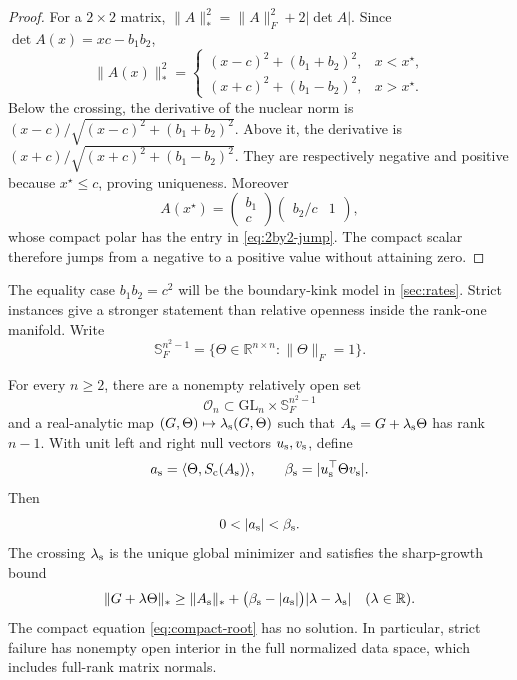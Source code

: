 \begin{proof}
For a \(2\times2\) matrix,
\(\|A\|_*^2=\|A\|_F^2+2|\det A|\).  Since
\(\det A(x)=xc-b_1b_2\),
\begin{equation}
 \|A(x)\|_*^2=
 \begin{cases}
 (x-c)^2+(b_1+b_2)^2,&x<x^\star,\\
 (x+c)^2+(b_1-b_2)^2,&x>x^\star.
 \end{cases}
 \label{eq:2by2-branches}
\end{equation}
Below the crossing, the derivative of the nuclear norm is
\((x-c)/\sqrt{(x-c)^2+(b_1+b_2)^2}\).  Above it, the derivative is
\((x+c)/\sqrt{(x+c)^2+(b_1-b_2)^2}\).  They are respectively negative and
positive because \(x^\star\le c\), proving uniqueness.
Moreover
\[
 A(x^\star)=
 \begin{pmatrix}b_1\\c\end{pmatrix}
 \begin{pmatrix}b_2/c&1\end{pmatrix},
\]
whose compact polar has the entry in \eqref{eq:2by2-jump}.  The compact
scalar therefore jumps from a negative to a positive value without attaining
zero.
\end{proof}

The equality case \(b_1b_2=c^2\) will be the boundary-kink model in
\cref{sec:rates}.  Strict instances give a stronger statement than relative
openness inside the rank-one manifold.  Write
\[
 \mathbb S_F^{n^2-1}
 =\{\Theta\in\mathbb R^{n\times n}:\|\Theta\|_F=1\}.
\]

\begin{theorem}
\label{thm:open-all-n}
For every \(n\ge2\), there are a nonempty relatively open set
\[
 \mathcal O_n\subset \mathrm{GL}_n\times\mathbb S_F^{n^2-1}
\]
and a real-analytic map
\((G,\Theta)\mapsto\lambda_{\rm s}(G,\Theta)\) such that
\(A_{\rm s}=G+\lambda_{\rm s}\Theta\) has rank \(n-1\).  With unit left and
right null vectors \(u_{\rm s},v_{\rm s}\), define
\begin{equation}
 a_{\rm s}=\langle\Theta,S_{\mathrm c}(A_{\rm s})\rangle,
 \qquad
 \beta_{\rm s}=|u_{\rm s}^\top\Theta v_{\rm s}|.
 \label{eq:full-open-ab}
\end{equation}
Then
\begin{equation}
 0<|a_{\rm s}|<\beta_{\rm s}.
 \label{eq:strict-failure}
\end{equation}
The crossing \(\lambda_{\rm s}\) is the unique global minimizer and satisfies
the sharp-growth bound
\begin{equation}
 \|G+\lambda\Theta\|_*
 \ge \|A_{\rm s}\|_*
 +\bigl(\beta_{\rm s}-|a_{\rm s}|\bigr)
  |\lambda-\lambda_{\rm s}|
 \quad(\lambda\in\mathbb R).
 \label{eq:sharp-growth}
\end{equation}
The compact equation \eqref{eq:compact-root} has no solution.  In particular,
strict failure has nonempty open interior in the full normalized data space,
which includes full-rank matrix normals.
\end{theorem}

